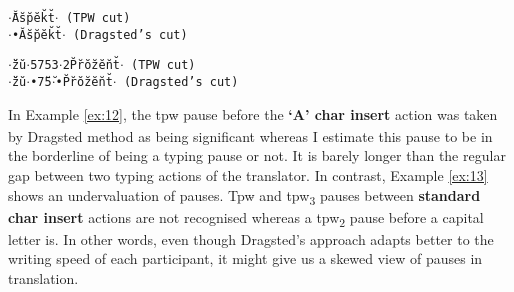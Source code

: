 \begin{exe}
  \ex\label{ex:12}
\tt{$\cdot$\={ }A\u{ }s\u{ }p\u{ }e\u{ }k\u{ }t\u{ }$\cdot$} (TPW cut)\\
\tt{$\cdot$•A\u{ }s\u{ }p\u{ }e\u{ }k\u{ }t\u{ }$\cdot$} (Dragsted's cut)
\end{exe}

\begin{exe}
  \ex\label{ex:13}
\tt{$\cdot$\u{ }z\u{ }u\u{ }$\cdot$57\={ }53$\cdot$2P\u{ }r\u{ }o\u{ }z\u{ }e\u{ }n\u{ }t\u{ }$\cdot$} (TPW cut)\\
\tt{$\cdot$\u{ }z\u{ }u\u{ }$\cdot$•7\u{ }5\u{ }$\cdot$•P\u{ }r\u{ }o\u{ }z\u{ }e\u{ }n\u{ }t\u{ }$\cdot$} (Dragsted's cut)
\end{exe}

In Example \ref{ex:12}, the tpw\textsubscript{\={ }} pause before the \textbf{`A' char insert} action was taken by Dragsted method as being significant whereas I estimate this pause to be in the borderline of being a typing pause or not. It is barely longer than the regular gap between two typing actions of the translator. In contrast, Example \ref{ex:13} shows an undervaluation of pauses. Tpw\textsubscript{\={ }} and tpw\textsubscript{3} pauses between \textbf{standard char insert} actions are not recognised whereas a tpw\textsubscript{2} pause before a capital letter is. In other words, even though Dragsted's approach adapts better to the writing speed of each participant, it might give us a skewed view of pauses in translation.